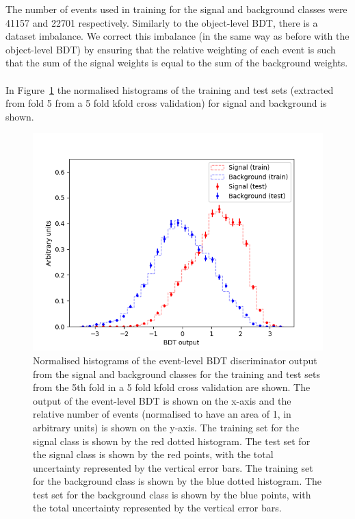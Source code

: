 The number of events used in training for the signal and background classes were 41157 and 22701 respectively. Similarly to the object-level BDT, there is a dataset imbalance. We correct this imbalance (in the same way as before with the object-level BDT) by ensuring that the relative weighting of each event is such that the sum of the signal weights is equal to the sum of the background weights.\\\\

In Figure~\ref{fig:event-bdt-overtrain-check} the normalised histograms of the training and test sets (extracted from fold 5 from a 5 fold kfold cross validation) for signal and background is shown.
\begin{figure}[h!]
	\includegraphics[scale=0.8]{figures/overtrainingCheck_4lep_event.png}
	\centering
	\caption{Normalised histograms of the event-level BDT discriminator output from the signal and background classes for the training and test sets from the 5th fold in a 5 fold kfold cross validation are shown. The output of the event-level BDT is shown on the x-axis and the relative number of events (normalised to have an area of 1, in arbitrary units) is shown on the y-axis. The training set for the signal class is shown by the red dotted histogram. The test set for the signal class is shown by the red points, with the total uncertainty represented by the vertical error bars. The training set for the background class is shown by the blue dotted histogram. The test set for the background class is shown by the blue points, with the total uncertainty represented by the vertical error bars.}
	\label{fig:event-bdt-overtrain-check}
\end{figure}

